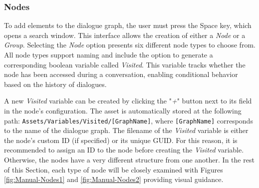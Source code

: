 \subsubsection{Nodes}
To add elements to the dialogue graph, the user must press the Space key, which opens a search window. This interface allows the creation of either a \textit{Node} or a \textit{Group}. Selecting the \textit{Node} option presents six different node types to choose from. All node types support naming and include the option to generate a corresponding boolean variable called \textit{Visited}. This variable tracks whether the node has been accessed during a conversation, enabling conditional behavior based on the history of dialogues.

A new \textit{Visited} variable can be created by clicking the "\textit{+}" button next to its field in the node's configuration. The asset is automatically stored at the following path: \verb|Assets/Variables/Visited/[GraphName]|, where \verb|[GraphName]| corresponds to the name of the dialogue graph. The filename of the \textit{Visited} variable is either the node’s custom ID (if specified) or its unique GUID. For this reason, it is recommended to assign an ID to the node before creating the \textit{Visited} variable. Otherwise, the nodes have a very different structure from one another. In the rest of this Section, each type of node will be closely examined with Figures \ref{fig:Manual-Nodes1} and \ref{fig:Manual-Nodes2} providing visual guidance.


